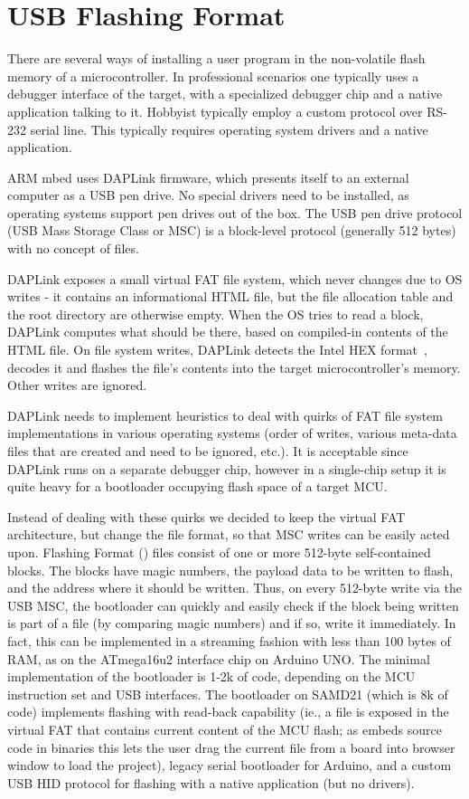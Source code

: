 \section{USB Flashing Format}
\label{sec:uf2}

There are several ways of installing a user program in the non-volatile flash memory
of a microcontroller. In professional scenarios one typically uses a debugger
interface of the target, with a specialized debugger chip and a native application
talking to it. Hobbyist typically employ a custom protocol over RS-232 serial
line. This typically requires operating system drivers and a native application.

ARM mbed uses DAPLink firmware, which presents itself to an external computer
as a USB pen drive. No special drivers need to be installed, as operating
systems support pen drives out of the box. The USB pen drive protocol (USB Mass
Storage Class or MSC) is a block-level protocol (generally 512 bytes) with no
concept of files. 

DAPLink exposes a small virtual FAT file system, which
never changes due to OS writes - it contains an informational HTML file, but
the file allocation table and the root directory are otherwise empty.
When the OS tries to read a block, DAPLink computes what should be there, 
based on compiled-in contents of the HTML file.
On file system writes, DAPLink detects the Intel HEX format~\cite{IntelHEX}, 
decodes it and flashes the file's contents into the target microcontroller's memory. 
Other writes are ignored.

DAPLink needs to implement heuristics to deal with quirks of FAT file
system implementations in various operating systems (order of writes, various meta-data files
that are created and need to be ignored, etc.). It is acceptable since DAPLink runs
on a separate debugger chip, however in a single-chip setup it is quite heavy for a bootloader occupying 
flash space of a target MCU.

Instead of dealing with these quirks we decided to keep the virtual FAT architecture, but change 
the file format, so that MSC writes can be easily acted upon.
Flashing Format (\UF) files consist of one or more 512-byte self-contained blocks.
The blocks have magic numbers, the payload data to be written to flash,
and the address where it should be written.
Thus, on every 512-byte write via the USB MSC, the bootloader can quickly and easily
check if the block being written is part of a \UF file (by comparing magic numbers)
and if so, write it immediately. In fact, this can be implemented in a streaming
fashion with less than 100 bytes of RAM, as on the ATmega16u2 interface chip
on Arduino UNO.
The minimal implementation of the \UF bootloader is 1-2k of code, depending
on the MCU instruction set and USB interfaces.
The bootloader on SAMD21 (which is 8k of code) implements \UF flashing with read-back capability (ie.,
a \UF file is exposed in the virtual FAT that contains current content of the 
MCU flash; as \MC embeds source code in binaries this lets the user drag the current \UF file from
a board into \MC browser window to load the project), legacy serial bootloader for Arduino, and a custom USB HID protocol
for flashing with a native application (but no drivers).

